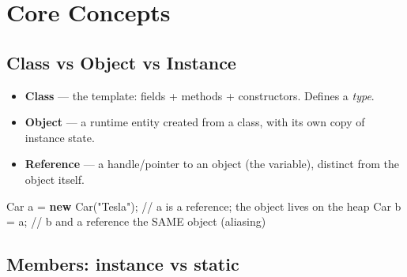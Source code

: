\documentclass[11pt]{article}
\providecommand{\tightlist}{\setlength{\itemsep}{1pt}\setlength{\parskip}{0pt}}
\newenvironment{Shaded}{\begin{snugshade}}{\end{snugshade}}
\newcommand{\CommentTok}[1]{\textcolor[rgb]{0.48,0.49,0.49}{#1}}
\newcommand{\FunctionTok}[1]{\textcolor[rgb]{0.56,0.27,0.68}{#1}}
\newcommand{\KeywordTok}[1]{\textcolor[rgb]{0.81,0.81,0.76}{\textbf{#1}}}
\newcommand{\NormalTok}[1]{\textcolor[rgb]{0.81,0.81,0.76}{#1}}
\newcommand{\OperatorTok}[1]{\textcolor[rgb]{0.81,0.81,0.76}{#1}}
\newcommand{\StringTok}[1]{\textcolor[rgb]{0.96,0.31,0.31}{#1}}
\begin{document}
\section{Core Concepts}\label{core-concepts}

\subsection{Class vs Object vs Instance}\label{class-vs-object-vs-instance}

\begin{itemize}
\tightlist
\item
  \textbf{Class} --- the template: fields + methods + constructors. Defines a \emph{type}.
\item
  \textbf{Object} --- a runtime entity created from a class, with its own copy of instance state.
\item
  \textbf{Reference} --- a handle/pointer to an object (the variable), distinct from the object itself.
\end{itemize}


\begin{Shaded}
\begin{Highlighting}[]
\NormalTok{Car a }\OperatorTok{=} \KeywordTok{new} \FunctionTok{Car}\OperatorTok{(}\StringTok{"Tesla"}\OperatorTok{);}   \CommentTok{// \textquotesingle{}a\textquotesingle{} is a reference; the object lives on the heap}
\NormalTok{Car b }\OperatorTok{=}\NormalTok{ a}\OperatorTok{;}                  \CommentTok{// b and a reference the SAME object (aliasing)}
\end{Highlighting}
\end{Shaded}

\subsection{Members: instance vs static}\label{members-instance-vs-static}
\end{document}
